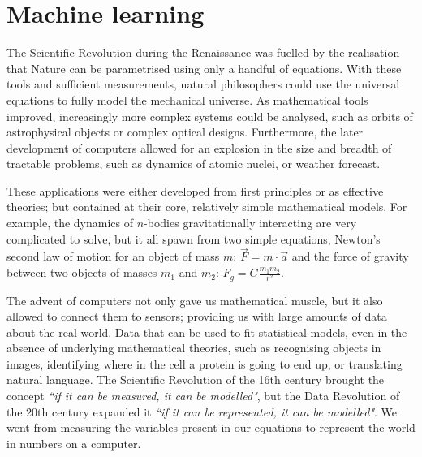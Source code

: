 \chapter{Machine learning}

The Scientific Revolution during the Renaissance 
was fuelled by the realisation that Nature can be parametrised using only a handful of equations.
With these tools and sufficient measurements, natural philosophers could use the universal equations to fully model the mechanical universe.
As mathematical tools improved, increasingly more complex systems could be analysed, such as orbits of astrophysical objects or complex optical designs.
Furthermore, the later development of computers allowed for an explosion in the size and breadth of tractable problems, such as dynamics of atomic nuclei, or weather forecast.

These applications were either developed from first principles or as effective theories; but contained at their core, relatively simple mathematical models.
For example, the dynamics of $n$-bodies gravitationally interacting are very complicated to solve, but it all spawn from two simple equations, Newton's second law of motion for an object of mass $m$: $\vec{F} = m \cdot \vec{a}$ and the force of gravity between two objects of masses $m_1$ and $m_2$: $F_g=G\frac{m_1  m_2}{r^2}$.

The advent of computers
 not only gave us mathematical muscle, but it also allowed to connect them to sensors;
providing us with large amounts of data about the real world.
Data that can be used to fit statistical models, even in the absence of underlying mathematical theories, such as recognising objects in images, identifying where in the cell a protein is going to end up, or translating natural language.
The Scientific Revolution of the 16th century brought the concept \emph{``if it can be measured, it can be modelled"}, but the Data Revolution of the 20th century expanded it \emph{``if it can be \emph{represented}, it can be modelled"}.
We went from measuring the variables present in our equations to represent the world in numbers on a computer.


